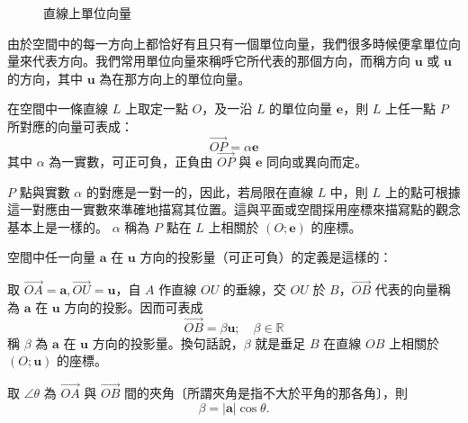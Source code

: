 \begin{figure}[H]
\begin{minipage}{0.32\textwidth}
\caption{直線上單位向量}
\label{fig:b3s-fig3-32-3}
\end{minipage}
\end{figure}

由於空間中的每一方向上都恰好有且只有一個單位向量，我們很多時候便拿單位向量來代表方向。我們常用單位向量來稱呼它所代表的那個方向，而稱方向 $\mathbf{u}$ 或 $\mathbf{u}$ 的方向，其中 $\mathbf{u}$ 為在那方向上的單位向量。

在空間中一條直線 $L$ 上取定一點 $O$，及一沿 $L$ 的單位向量 $\mathbf{e}$，則 $L$ 上任一點 $P$ 所對應的向量可表成：
\[ \vec{OP} = \alpha\mathbf{e} \]
其中 $\alpha$ 為一實數，可正可負，正負由 $\vec{OP}$ 與 $\mathbf{e}$ 同向或異向而定。

$P$ 點與實數 $\alpha$ 的對應是一對一的，因此，若局限在直線 $L$ 中，則 $L$ 上的點可根據這一對應由一實數來準確地描寫其位置。這與平面或空間採用座標來描寫點的觀念基本上是一樣的。 $\alpha$ 稱為 $P$ 點在 $L$ 上相關於 $(O; \mathbf{e})$ 的座標。

\begin{definition}
空間中任一向量 $\mathbf{a}$ 在 $\mathbf{u}$ 方向的投影量（可正可負）的定義是這樣的：

取 $\vec{OA} = \mathbf{a}, \vec{OU} = \mathbf{u}$，自 $A$ 作直線 $OU$ 的垂線，交 $OU$ 於 $B$，$\vec{OB}$ 代表的向量稱為 $\mathbf{a}$ 在 $\mathbf{u}$ 方向的投影。因而可表成
\[ \vec{OB} = \beta\mathbf{u}; \quad \beta \in \mathbb{R} \]
稱 $\beta$ 為 $\mathbf{a}$ 在 $\mathbf{u}$ 方向的投影量。換句話說，$\beta$ 就是垂足 $B$ 在直線 $OB$ 上相關於 $(O; \mathbf{u})$ 的座標。

取 $\angle\theta$ 為 $\vec{OA}$ 與 $\vec{OB}$ 間的夾角〔所謂夾角是指不大於平角的那各角〕，則
\[ \beta = |\mathbf{a}|\cos\theta. \]
\end{definition}

